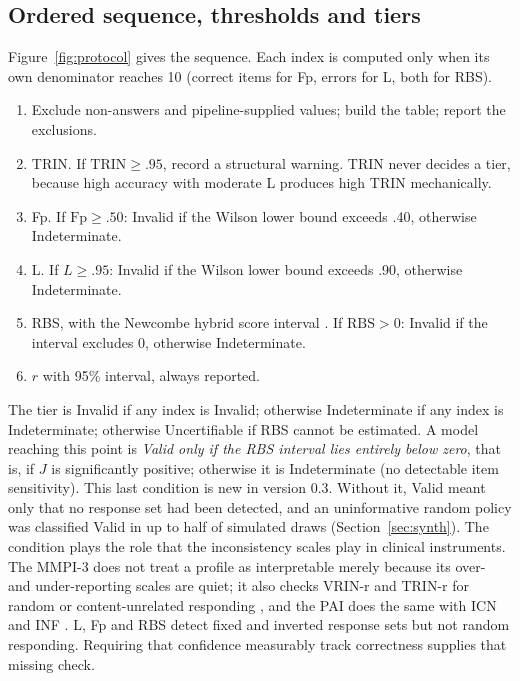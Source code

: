 \documentclass[11pt,a4paper]{article}
\begin{document}
\subsection{Ordered sequence, thresholds and tiers}

Figure~\ref{fig:protocol} gives the sequence. Each index is computed only when its own denominator reaches 10 (correct items for Fp, errors for L, both for RBS).
\begin{enumerate}
\item Exclude non-answers and pipeline-supplied values; build the table; report the exclusions.
\item TRIN. If $\text{TRIN} \geq .95$, record a structural warning. TRIN never decides a tier, because high accuracy with moderate L produces high TRIN mechanically.
\item Fp. If $\text{Fp} \geq .50$: Invalid if the Wilson lower bound \citep{wilson1927} exceeds .40, otherwise Indeterminate.
\item L. If $L \geq .95$: Invalid if the Wilson lower bound exceeds .90, otherwise Indeterminate.
\item RBS, with the Newcombe hybrid score interval \citep{newcombe1998}. If $\text{RBS} > 0$: Invalid if the interval excludes 0, otherwise Indeterminate.
\item $r$ with 95\% interval, always reported.
\end{enumerate}
The tier is Invalid if any index is Invalid; otherwise Indeterminate if any index is Indeterminate; otherwise Uncertifiable if RBS cannot be estimated. A model reaching this point is \emph{Valid only if the RBS interval lies entirely below zero}, that is, if $J$ is significantly positive; otherwise it is Indeterminate (no detectable item sensitivity). This last condition is new in version 0.3. Without it, Valid meant only that no response set had been detected, and an uninformative random policy was classified Valid in up to half of simulated draws (Section~\ref{sec:synth}). The condition plays the role that the inconsistency scales play in clinical instruments. The MMPI-3 does not treat a profile as interpretable merely because its over- and under-reporting scales are quiet; it also checks VRIN-r and TRIN-r for random or content-unrelated responding \citep{benporath2020mmpi3}, and the PAI does the same with ICN and INF \citep{morey2007}. L, Fp and RBS detect fixed and inverted response sets but not random responding. Requiring that confidence measurably track correctness supplies that missing check.
\end{document}
